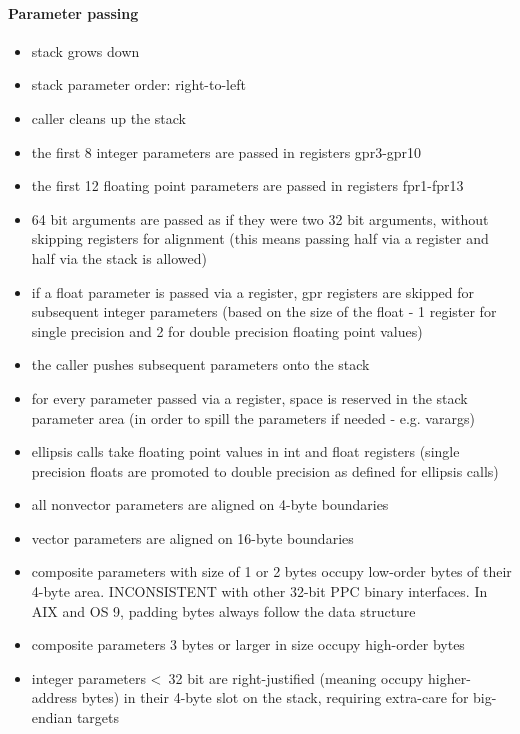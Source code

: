 \paragraph{Parameter passing}

\begin{itemize}
\item stack grows down
\item stack parameter order: right-to-left
\item caller cleans up the stack
\item the first 8 integer parameters are passed in registers gpr3-gpr10
\item the first 12 floating point parameters are passed in registers fpr1-fpr13
\item 64 bit arguments are passed as if they were two 32 bit arguments, without skipping registers for alignment (this means passing half via a register and half via the stack is allowed)
\item if a float parameter is passed via a register, gpr registers are skipped for subsequent integer parameters (based on the size of
the float - 1 register for single precision and 2 for double precision floating point values)
\item the caller pushes subsequent parameters onto the stack
\item for every parameter passed via a register, space is reserved in the stack parameter area (in order to spill the parameters if
needed - e.g. varargs)
\item ellipsis calls take floating point values in int and float registers (single precision floats are promoted to double precision
as defined for ellipsis calls)
\item all nonvector parameters are aligned on 4-byte boundaries
\item vector parameters are aligned on 16-byte boundaries
\item composite parameters with size of 1 or 2 bytes occupy low-order bytes of their 4-byte area. INCONSISTENT with other 32-bit PPC
binary interfaces. In AIX and OS 9, padding bytes always follow the data structure
\item composite parameters 3 bytes or larger in size occupy high-order bytes
\item integer parameters \textless\ 32 bit are right-justified (meaning occupy higher-address bytes) in their 4-byte slot on the stack, requiring extra-care for big-endian targets
\end{itemize}


